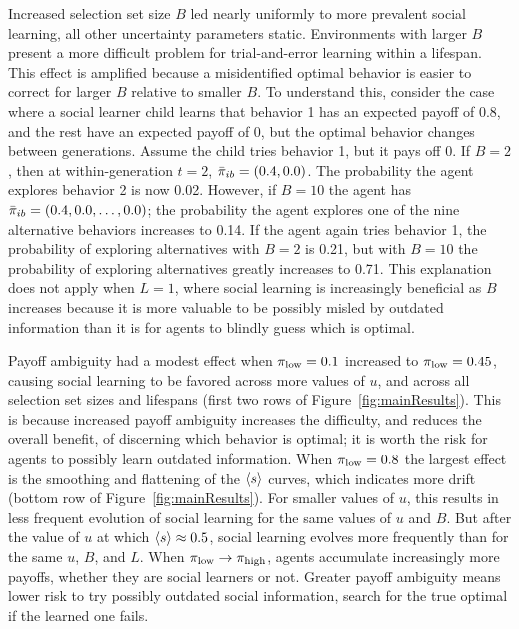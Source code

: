 \documentclass[letterpaper,11.5pt]{scrartcl}
\begin{document}
Increased selection set size $B$ led nearly uniformly to more prevalent social
learning, all other uncertainty parameters static. Environments with 
larger $B$ present a more difficult problem for trial-and-error learning within
a lifespan. This effect is amplified because a misidentified optimal
behavior is easier to correct for larger $B$ relative to smaller $B$.  
To understand this, consider the case where a social learner child learns
that behavior 1 has an expected payoff of 0.8, and the rest have an expected
payoff of 0, but the optimal behavior changes between generations. Assume
the child tries behavior 1, but it pays off 0.
If $B=2$, then at within-generation $t=2$, $\bar\pi_{ib} = (0.4, 0.0)$. The probability
the agent explores behavior 2 is now 0.02. However, if $B=10$ the agent has
$\bar\pi_{ib} = (0.4, 0.0, \ldots, 0.0)$; the probability
the agent explores one of the nine alternative behaviors increases to 0.14.
If the agent again tries behavior 1, the probability of exploring alternatives
with $B=2$ is 0.21, but with $B=10$ the probability of exploring alternatives
greatly increases to 0.71. This explanation does not apply when $L=1$, where
social learning is increasingly beneficial as $B$ increases because it is more 
valuable to be possibly misled by outdated information than it is for agents
to blindly guess which is optimal.

Payoff ambiguity had a modest effect when $\pi_{\mathrm{low}} = 0.1$ increased to $\pi_{\mathrm{low}} =
0.45$, causing social learning to be favored across more values of $u$, and across
all selection set sizes and lifespans (first two rows of
Figure~\ref{fig:mainResults}).  This is because increased payoff ambiguity increases
the difficulty, and reduces the overall benefit, of discerning which behavior is
optimal; it is worth the risk for agents to possibly learn outdated information.
When $\pi_{\mathrm{low}} = 0.8$ the largest effect is the smoothing and flattening of the
$\langle s \rangle$ curves, which indicates more drift (bottom row of
Figure~\ref{fig:mainResults}).  For smaller values of $u$, this results in less
frequent evolution of social learning for the same values of $u$ and $B$. But after
the value of $u$ at which $\langle s \rangle \approx 0.5$, social learning evolves more
frequently than for the same $u$, $B$, and $L$. When $\pi_{\mathrm{low}} \to \pi_{\mathrm{high}}$, agents 
accumulate increasingly more payoffs, whether they are social learners or not. 
Greater payoff ambiguity means lower risk to try possibly outdated social
information, search for the true optimal if the learned one fails. 
\end{document}
